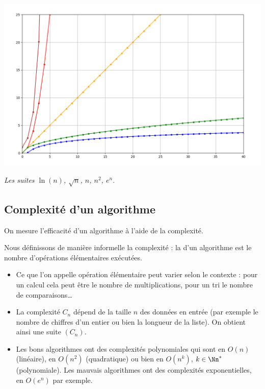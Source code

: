 \documentclass[11pt,class=report,crop=false]{standalone}
\begin{document}
 \begin{center}
 	\includegraphics[scale=\myscale,scale=0.3]{figures/ecran-grandO}
 	
 	\emph{Les suites  $\ln(n)$, $\sqrt{n}$, $n$, $n^2$, $e^n$.}
 \end{center}
 
  
\subsection{Complexité d'un algorithme}

On mesure l'efficacité d'un algorithme à l'aide de la complexité. 

Nous définissons de manière informelle la complexité : la  d'un algorithme est le nombre d'opérations élémentaires exécutées.

\begin{itemize}
  \item Ce que l'on appelle \og{}opération élémentaire\fg{} peut varier selon le contexte : pour un calcul cela peut être le nombre de multiplications, pour un tri le nombre de comparaisons\ldots
	
	\item La complexité $C_n$ dépend de la taille $n$ des données en entrée (par exemple le nombre de chiffres d'un entier ou bien la longueur de la liste). On obtient ainsi une suite $(C_n)$.
	
	\item Les bons algorithmes ont des complexités polynomiales qui sont en $O(n)$ (linéaire), en $O(n^2)$ (quadratique) ou bien en $O(n^k)$, $k\in\Nn^*$ (polynomiale). Les mauvais algorithmes ont des complexités exponentielles, en $O(e^n)$ par exemple.
\end{itemize}
\end{document}
